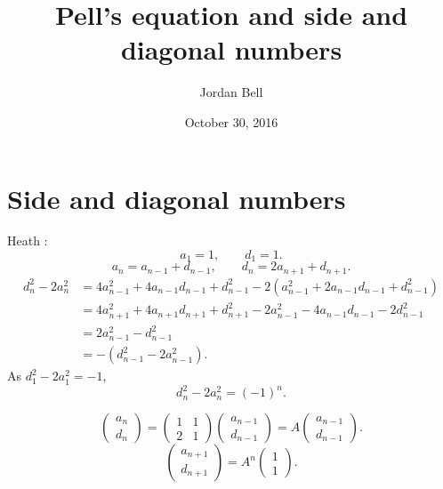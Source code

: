 \documentclass{article}
\theoremstyle{definition}
\theoremstyle{definition}
\begin{document}
\title{Pell's equation and side and diagonal numbers}
\author{Jordan Bell}
\date{October 30, 2016}
\maketitle


\section{Side and diagonal numbers}
Heath \cite[pp.~117--118]{diophantus}:
\[
a_1=1, \qquad d_1=1.
\]
\[
a_n=a_{n-1}+d_{n-1},\qquad d_n=2a_{n+1}+d_{n+1}.
\]
\begin{align*}
d_n^2-2a_n^2&=4a_{n-1}^2+4a_{n-1}d_{n-1}+d_{n-1}^2
-2(a_{n-1}^2+2a_{n-1}d_{n-1}+d_{n-1}^2)\\
&=4a_{n+1}^2+4a_{n+1}d_{n+1}+d_{n+1}^2-2a_{n-1}^2
-4a_{n-1}d_{n-1}-2d_{n-1}^2\\
&=2a_{n-1}^2-d_{n-1}^2\\
&=-(d_{n-1}^2-2a_{n-1}^2).
\end{align*}
As $d_1^2-2a_1^2=-1$,
\[
d_n^2-2a_n^2 = (-1)^n.
\]

\[
\begin{pmatrix}a_n\\d_n\end{pmatrix}
=\begin{pmatrix}1&1\\2&1\end{pmatrix}
\begin{pmatrix}
a_{n-1}\\
d_{n-1}
\end{pmatrix}
=A\begin{pmatrix}
a_{n-1}\\
d_{n-1}
\end{pmatrix}.
\]
\[
\begin{pmatrix}a_{n+1}\\d_{n+1}\end{pmatrix} = A^n \begin{pmatrix}1\\1\end{pmatrix}.
\]
\end{document}
